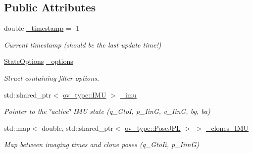 \subsection*{Public Attributes}
\begin{DoxyCompactItemize}
\item 
\mbox{\label{classov__msckf_1_1State_ae7615177e3edeb8eac39eb05867dc72f}} 
double \hyperlink{classov__msckf_1_1State_ae7615177e3edeb8eac39eb05867dc72f}{\+\_\+timestamp} = -\/1
\begin{DoxyCompactList}\small\item\em Current timestamp (should be the last update time!) \end{DoxyCompactList}\item 
\mbox{\label{classov__msckf_1_1State_a2af409a71537d305b45c62a91b6dda75}} 
\hyperlink{structov__msckf_1_1StateOptions}{State\+Options} \hyperlink{classov__msckf_1_1State_a2af409a71537d305b45c62a91b6dda75}{\+\_\+options}
\begin{DoxyCompactList}\small\item\em Struct containing filter options. \end{DoxyCompactList}\item 
\mbox{\label{classov__msckf_1_1State_aeb5600395921fb8ac81f585006186a64}} 
std\+::shared\+\_\+ptr$<$ \hyperlink{classov__type_1_1IMU}{ov\+\_\+type\+::\+I\+MU} $>$ \hyperlink{classov__msckf_1_1State_aeb5600395921fb8ac81f585006186a64}{\+\_\+imu}
\begin{DoxyCompactList}\small\item\em Pointer to the \char`\"{}active\char`\"{} I\+MU state (q\+\_\+\+GtoI, p\+\_\+\+IinG, v\+\_\+\+IinG, bg, ba) \end{DoxyCompactList}\item 
\mbox{\label{classov__msckf_1_1State_a9fdd8bcc9f67c124257a8daa81bfb15d}} 
std\+::map$<$ double, std\+::shared\+\_\+ptr$<$ \hyperlink{classov__type_1_1PoseJPL}{ov\+\_\+type\+::\+Pose\+J\+PL} $>$ $>$ \hyperlink{classov__msckf_1_1State_a9fdd8bcc9f67c124257a8daa81bfb15d}{\+\_\+clones\+\_\+\+I\+MU}
\begin{DoxyCompactList}\small\item\em Map between imaging times and clone poses (q\+\_\+\+Gto\+Ii, p\+\_\+\+IiinG) \end{DoxyCompactList}\item 

\end{DoxyCompactItemize}
